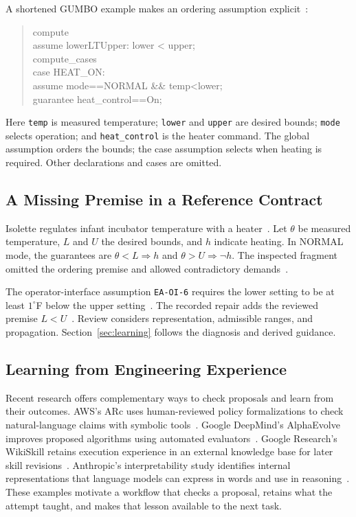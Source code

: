 A shortened GUMBO example makes an ordering assumption explicit~\cite{tahat2026scp,scpCheckpoint}:
\begin{quote}
\begin{minipage}{\linewidth}
\small\ttfamily
compute\\
\hspace*{1em}assume lowerLTUpper: lower < upper;\\
compute\_cases\\
\hspace*{1em}case HEAT\_ON:\\
\hspace*{2em}assume mode==NORMAL \&\& temp<lower;\\
\hspace*{2em}guarantee heat\_control==On;
\end{minipage}
\end{quote}
Here \texttt{temp} is measured temperature; \texttt{lower} and \texttt{upper} are desired bounds; \texttt{mode} selects operation; and \texttt{heat\_control} is the heater command. The global assumption orders the bounds; the case assumption selects when heating is required. Other declarations and cases are omitted.

\subsection{A Missing Premise in a Reference Contract}
Isolette regulates infant incubator temperature with a heater~\cite{lempia2009faa,hatcliff2024isolette}. Let $\theta$ be measured temperature, $L$ and $U$ the desired bounds, and $h$ indicate heating. In NORMAL mode, the guarantees are $\theta<L\Rightarrow h$ and $\theta>U\Rightarrow\neg h$. The inspected fragment omitted the ordering premise and allowed contradictory demands~\cite{scpCheckpoint}.

The operator-interface assumption \texttt{EA-OI-6} requires the lower setting to be at least $1^{\circ}$F below the upper setting~\cite[Appendix A.3.4, p.~A-11]{lempia2009faa}. The recorded repair adds the reviewed premise $L<U$~\cite{scpCheckpoint}. Review considers representation, admissible ranges, and propagation. Section~\ref{sec:learning} follows the diagnosis and derived guidance.

\subsection{Learning from Engineering Experience}
Recent research offers complementary ways to check proposals and learn from their outcomes. AWS's ARc uses human-reviewed policy formalizations to check natural-language claims with symbolic tools~\cite{bayless2025arc}. Google DeepMind's AlphaEvolve improves proposed algorithms using automated evaluators~\cite{novikov2025alphaevolve}. Google Research's WikiSkill retains execution experience in an external knowledge base for later skill revisions~\cite{tang2026wikiskill}. Anthropic's interpretability study identifies internal representations that language models can express in words and use in reasoning~\cite{gurnee2026workspace}. These examples motivate a workflow that checks a proposal, retains what the attempt taught, and makes that lesson available to the next task.

